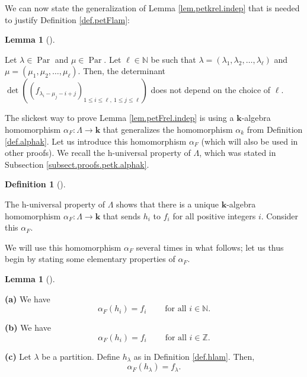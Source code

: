 \documentclass[numbers=enddot,12pt,final,onecolumn,notitlepage]{scrartcl}%
\theoremstyle{definition}
\newtheorem{lem}[theo]{Lemma}
\newenvironment{lemma}[1][]
{\begin{lem}[#1]\begin{leftbar}}
{\end{leftbar}\end{lem}}
\newtheorem{defi}[theo]{Definition}
\newenvironment{definition}[1][]
{\begin{defi}[#1]\begin{leftbar}}
{\end{leftbar}\end{defi}}
\begin{document}
We can now state the generalization of Lemma \ref{lem.petkrel.indep} that is
needed to justify Definition \ref{def.petFlam}:

\begin{lemma}
\label{lem.petFrel.indep}Let $\lambda\in\operatorname*{Par}$ and $\mu
\in\operatorname*{Par}$. Let $\ell\in\mathbb{N}$ be such that $\lambda=\left(
\lambda_{1},\lambda_{2},\ldots,\lambda_{\ell}\right)  $ and $\mu=\left(
\mu_{1},\mu_{2},\ldots,\mu_{\ell}\right)  $. Then, the determinant
$\det\left(  \left(  f_{\lambda_{i}-\mu_{j}-i+j}\right)  _{1\leq i\leq
\ell,\ 1\leq j\leq\ell}\right)  $ does not depend on the choice of $\ell$.
\end{lemma}

The slickest way to prove Lemma \ref{lem.petFrel.indep} is using a
$\mathbf{k}$-algebra homomorphism $\alpha_{F}:\Lambda\rightarrow\mathbf{k}$
that generalizes the homomorphism $\alpha_{k}$ from Definition
\ref{def.alphak}. Let us introduce this homomorphism $\alpha_{F}$ (which will
also be used in other proofs). We recall the h-universal property of $\Lambda
$, which was stated in Subsection \ref{subsect.proofs.petk.alphak}.

\begin{definition}
\label{def.alphaF}The h-universal property of $\Lambda$ shows that there is a
unique $\mathbf{k}$-algebra homomorphism $\alpha_{F}:\Lambda\rightarrow
\mathbf{k}$ that sends $h_{i}$ to $f_{i}$ for all positive integers $i$.
Consider this $\alpha_{F}$.
\end{definition}

We will use this homomorphism $\alpha_{F}$ several times in what follows; let
us thus begin by stating some elementary properties of $\alpha_{F}$.

\begin{lemma}
\label{lem.alphaF.h}\textbf{(a)} We have%
\begin{equation}
\alpha_{F}\left(  h_{i}\right)  =f_{i}\ \ \ \ \ \ \ \ \ \ \text{for all }%
i\in\mathbb{N}. \label{pf.thm.GF.main.alk}%
\end{equation}


\textbf{(b)} We have%
\begin{equation}
\alpha_{F}\left(  h_{i}\right)  =f_{i}\ \ \ \ \ \ \ \ \ \ \text{for all }%
i\in\mathbb{Z}. \label{pf.thm.GF.main.alkZ}%
\end{equation}


\textbf{(c)} Let $\lambda$ be a partition. Define $h_{\lambda}$ as in
Definition \ref{def.hlam}. Then,%
\begin{equation}
\alpha_{F}\left(  h_{\lambda}\right)  =f_{\lambda}.
\label{pf.thm.GF.main.alkh}%
\end{equation}

\end{lemma}
\end{document}
